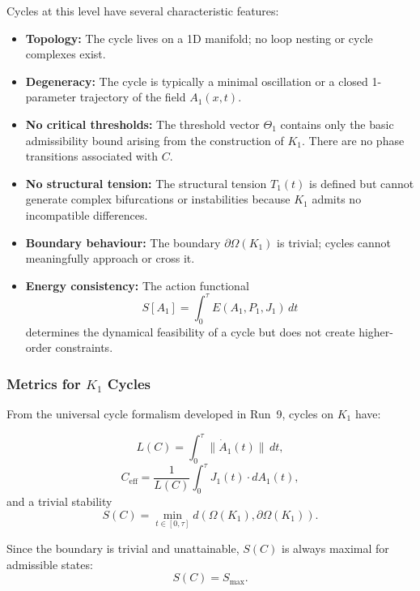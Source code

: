 Cycles at this level have several characteristic features:

\begin{itemize}
  \item \textbf{Topology:}  
        The cycle lives on a 1D manifold; no loop nesting or cycle
        complexes exist.

  \item \textbf{Degeneracy:}  
        The cycle is typically a minimal oscillation or a closed
        1-parameter trajectory of the field $A_1(x,t)$.

  \item \textbf{No critical thresholds:}  
        The threshold vector $\Theta_1$ contains only the basic
        admissibility bound arising from the construction of $K_1$.
        There are no phase transitions associated with $C$.

  \item \textbf{No structural tension:}  
        The structural tension
        $T_1(t)$ is defined but cannot generate complex bifurcations or
        instabilities because $K_1$ admits no incompatible differences.

  \item \textbf{Boundary behaviour:}  
        The boundary $\partial\Omega(K_1)$ is trivial; cycles cannot
        meaningfully approach or cross it.

  \item \textbf{Energy consistency:}  
        The action functional
        \[
          S[A_1] = \int_0^\tau E(A_1,P_1,J_1)\, dt
        \]
        determines the dynamical feasibility of a cycle but does not
        create higher-order constraints.
\end{itemize}

\subsubsection{Metrics for \texorpdfstring{$K_1$}{K_1} Cycles}

From the universal cycle formalism developed in Run~9, cycles on $K_1$
have:

\[
  L(C) = \int_0^\tau \| \dot{A}_1(t) \|\, dt,
\]
\[
  C_{\mathrm{eff}} =
    \frac{1}{L(C)} \int_0^\tau J_1(t)\cdot dA_1(t),
\]
and a trivial stability
\[
  S(C) = \min_{t\in[0,\tau]} d(\Omega(K_1),\partial\Omega(K_1)).
\]

Since the boundary is trivial and unattainable, $S(C)$ is always
maximal for admissible states:
\[
  S(C) = S_{\max}.
\]

